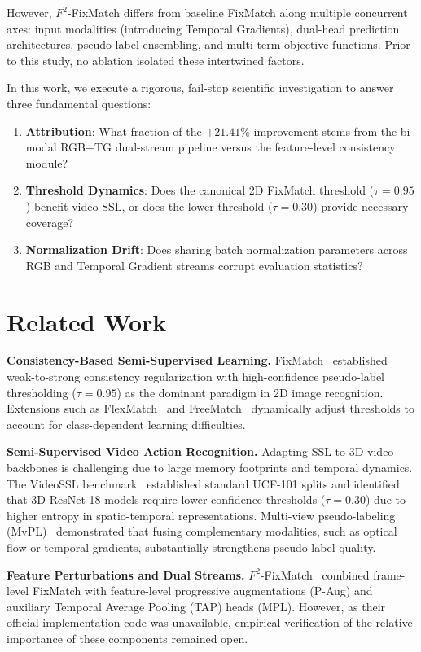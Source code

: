 \documentclass[10pt,twocolumn,letterpaper]{article}
\begin{document}
However, $F^2$-FixMatch differs from baseline FixMatch along multiple concurrent axes: input modalities (introducing Temporal Gradients), dual-head prediction architectures, pseudo-label ensembling, and multi-term objective functions. Prior to this study, no ablation isolated these intertwined factors.

In this work, we execute a rigorous, fail-stop scientific investigation to answer three fundamental questions:
\begin{enumerate}
    \item \textbf{Attribution}: What fraction of the $+21.41\%$ improvement stems from the bi-modal RGB+TG dual-stream pipeline versus the feature-level consistency module?
    \item \textbf{Threshold Dynamics}: Does the canonical 2D FixMatch threshold ($\tau = 0.95$) benefit video SSL, or does the lower threshold ($\tau = 0.30$) provide necessary coverage?
    \item \textbf{Normalization Drift}: Does sharing batch normalization parameters across RGB and Temporal Gradient streams corrupt evaluation statistics?
\end{enumerate}

\section{Related Work}
\label{sec:related}
\textbf{Consistency-Based Semi-Supervised Learning.} FixMatch~\cite{sohn2020fixmatch} established weak-to-strong consistency regularization with high-confidence pseudo-label thresholding ($\tau = 0.95$) as the dominant paradigm in 2D image recognition. Extensions such as FlexMatch~\cite{zhang2021flexmatch} and FreeMatch~\cite{wang2023freematch} dynamically adjust thresholds to account for class-dependent learning difficulties.

\textbf{Semi-Supervised Video Action Recognition.} Adapting SSL to 3D video backbones is challenging due to large memory footprints and temporal dynamics. The VideoSSL benchmark~\cite{xiao2021videossl} established standard UCF-101 splits and identified that 3D-ResNet-18 models require lower confidence thresholds ($\tau = 0.30$) due to higher entropy in spatio-temporal representations. Multi-view pseudo-labeling (MvPL)~\cite{kim2022mvpl} demonstrated that fusing complementary modalities, such as optical flow or temporal gradients, substantially strengthens pseudo-label quality.

\textbf{Feature Perturbations and Dual Streams.} $F^2$-FixMatch~\cite{tu2025f2fixmatch} combined frame-level FixMatch with feature-level progressive augmentations (P-Aug) and auxiliary Temporal Average Pooling (TAP) heads (MPL). However, as their official implementation code was unavailable, empirical verification of the relative importance of these components remained open.
\end{document}
